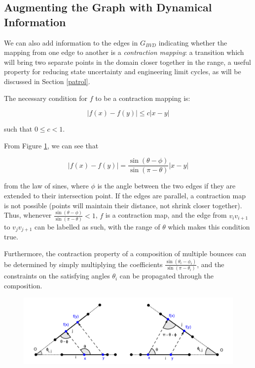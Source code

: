 \documentclass[]{styles/svproc}  %
\begin{document}
\subsection{Augmenting the Graph with Dynamical Information}

We can also add information to the edges in $G_{BVD}$ indicating whether the
mapping from one edge to another is a \emph{contraction mapping}: a transition
which will bring two separate points in the domain closer together in the range,
a useful property for reducing state uncertainty and engineering limit cycles,
as will be discussed in Section \ref{patrol}.

The necessary condition for $f$ to be a contraction mapping is:

\begin{equation*}
|f(x) - f(y)| \leq c |x-y|
\end{equation*}

such that $0 \leq c < 1$.

From Figure \ref{fig:cont_map}, we can see that

\begin{equation*}
|f(x) - f(y)| = \frac{\sin(\theta - \phi)}{\sin(\pi-\theta)} |x-y|
\end{equation*}

from the law of sines, where $\phi$ is the angle between the two edges if they
are extended to their intersection point. If the edges are parallel, a
contraction map is not possible (points will maintain their distance, not shrink
closer together). Thus, whenever $\frac{\sin(\theta - \phi)}{\sin(\pi-\theta)}
< 1$, $f$ is a contraction map, and the edge from $v_i v_{i+1}$ to $v_j
v_{j+1}$ can be labelled as such, with the range of $\theta$ which makes this
condition true.

Furthermore, the contraction property of a composition of multiple bounces can
be determined by simply multiplying the coefficients $\frac{\sin(\theta_i -
\phi_i)}{\sin(\pi-\theta_i)}$, and the constraints on the satisfying angles
$\theta_i$ can be propagated through the composition.

\begin{figure}
    \includegraphics[width=0.8\linewidth]{figures/contraction_map_cond.png}
    \centering
    \caption{\label{fig:cont_map}}
\end{figure}
\end{document}
